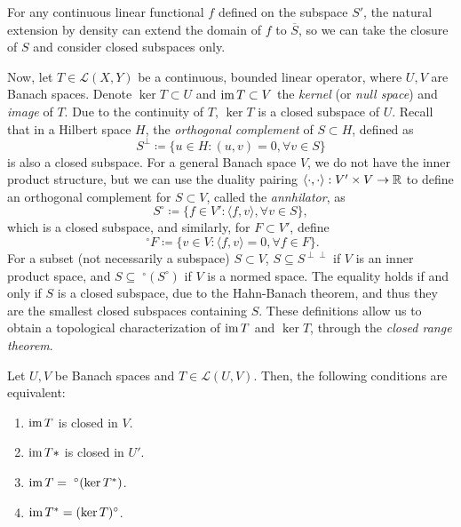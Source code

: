 For any continuous linear functional $f$ defined on the subspace $S'$, the natural extension by density can extend the domain of $f$ to $\overline{S}$, so we can take the closure of $S$ and consider closed subspaces only. 

Now, let $T\in \mathcal{L}(X,Y)$ be a continuous, bounded linear operator, where $U,V$ are Banach spaces. Denote $\ker T\subset U$ and $\operatorname{\text{im}} T\subset V$ the \emph{kernel} (or \emph{null space}) and \emph{image} of $T$. Due to the continuity of $T$, $\ker T$ is a closed subspace of $U$. Recall that in a Hilbert space $H$, the \emph{orthogonal complement} of $S\subset H$, defined as
\begin{equation*}
    S^\perp \coloneqq \{u\in H: (u,v)=0,\forall v\in S\}
\end{equation*}
is also a closed subspace. For a general Banach space $V$, we do not have the inner product structure, but we can use the duality pairing $\langle\cdot,\cdot\rangle:V'\times V\to \mathbb{R}$ to define an orthogonal complement for $S\subset V$, called the \emph{annhilator}, as 
\begin{equation*}
    S^\circ \coloneqq \{f\in V': \langle f, v\rangle,\forall v\in S\},
\end{equation*}
which is a closed subspace, and similarly, for $F\subset V'$, define
\begin{equation*}
    \phantom{.}^\circ F \coloneqq \{v\in V:\langle f,v\rangle = 0,\forall f\in F\}.
\end{equation*}
For a subset (not necessarily a subspace) $S\subset V$, $S\subseteq S^{\perp\perp}$ if $V$ is an inner product space, and $S\subseteq\phantom{.}^\circ(S^\circ)$ if $V$ is a normed space. The equality holds if and only if $S$ is a closed subspace, due to the Hahn-Banach theorem, and thus they are the smallest closed subspaces containing $S$. These definitions allow us to obtain a topological characterization of $\operatorname{\text{im}} T$ and $\ker T$, through the \emph{closed range theorem}. 
\begin{theorem}\label{thm:closed-range-theorem}
    Let $U,V$ be Banach spaces and $T\in\mathcal{L}(U,V)$. Then, the following conditions are equivalent: 
    \begin{enumerate}
        \item $\operatorname{\text{im}} T$ is closed in $V$. 
        \item $\operatorname{\text{im}} T*$ is closed in $U'$.
        \item $\operatorname{\text{im}} T = \phantom{.}^\circ (\ker T^*)$.
        \item $\operatorname{\text{im}} T^* = (\ker T)^\circ$.
    \end{enumerate}
\end{theorem}

